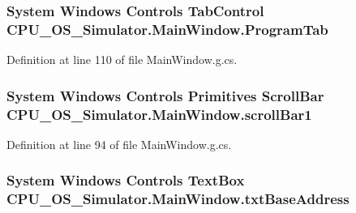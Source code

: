 \subsubsection[{Program\+Tab}]{\setlength{\rightskip}{0pt plus 5cm}System Windows Controls Tab\+Control C\+P\+U\+\_\+\+O\+S\+\_\+\+Simulator.\+Main\+Window.\+Program\+Tab\hspace{0.3cm}{\ttfamily [package]}}\label{class_c_p_u___o_s___simulator_1_1_main_window_a615ea960969aa9a61afdaef8cf039348}


Definition at line 110 of file Main\+Window.\+g.\+cs.

\hypertarget{class_c_p_u___o_s___simulator_1_1_main_window_a014812a0e9cd159be05250d94d9a5a8b}{}
\subsubsection[{scroll\+Bar1}]{\setlength{\rightskip}{0pt plus 5cm}System Windows Controls Primitives Scroll\+Bar C\+P\+U\+\_\+\+O\+S\+\_\+\+Simulator.\+Main\+Window.\+scroll\+Bar1\hspace{0.3cm}{\ttfamily [package]}}\label{class_c_p_u___o_s___simulator_1_1_main_window_a014812a0e9cd159be05250d94d9a5a8b}


Definition at line 94 of file Main\+Window.\+g.\+cs.

\hypertarget{class_c_p_u___o_s___simulator_1_1_main_window_aa6eeef1bfdd74aa90d6fea68987306ad}{}
\subsubsection[{txt\+Base\+Address}]{\setlength{\rightskip}{0pt plus 5cm}System Windows Controls Text\+Box C\+P\+U\+\_\+\+O\+S\+\_\+\+Simulator.\+Main\+Window.\+txt\+Base\+Address\hspace{0.3cm}{\ttfamily [package]}}\label{class_c_p_u___o_s___simulator_1_1_main_window_aa6eeef1bfdd74aa90d6fea68987306ad}


